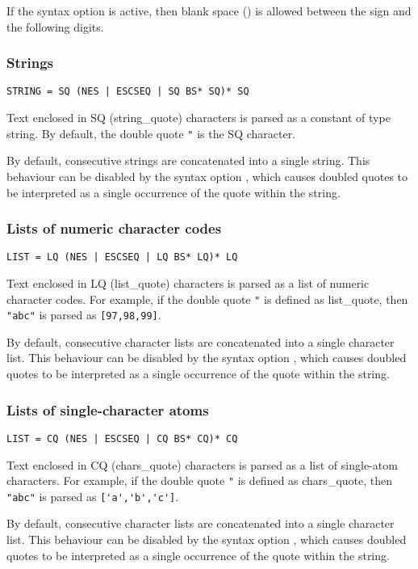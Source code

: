 If the syntax option  is active, then
blank space () is allowed between the sign and the following
digits.


\subsubsection{Strings}
\begin{verbatim}
STRING = SQ (NES | ESCSEQ | SQ BS* SQ)* SQ
\end{verbatim}
Text enclosed in SQ (string_quote) characters is parsed as a constant of type
string.  By default, the double quote \verb.". is the SQ character.

By default, consecutive strings are concatenated into a single string.
This behaviour can be disabled by the syntax option
, which causes doubled quotes to be
interpreted as a single occurrence of the quote within the string.

\subsubsection{Lists of numeric character codes}
\begin{verbatim}
LIST = LQ (NES | ESCSEQ | LQ BS* LQ)* LQ
\end{verbatim}
Text enclosed in LQ (list_quote) characters is parsed as a list of numeric
character codes.  For example, if the double quote \verb.". is defined as
list_quote, then \verb."abc". is parsed as \verb.[97,98,99]..

By default, consecutive character lists are concatenated into a single character
list.
This behaviour can be disabled by the syntax option
, which causes doubled quotes to be
interpreted as a single occurrence of the quote within the string.

\subsubsection{Lists of single-character atoms}
\begin{verbatim}
LIST = CQ (NES | ESCSEQ | CQ BS* CQ)* CQ
\end{verbatim}
Text enclosed in CQ (chars_quote) characters is parsed as a list of single-atom
characters.  For example, if the double quote \verb.". is defined as
chars_quote, then \verb."abc". is parsed as \verb.['a','b','c']..

By default, consecutive character lists are concatenated into a single character
list.
This behaviour can be disabled by the syntax option
, which causes doubled quotes to be
interpreted as a single occurrence of the quote within the string.

